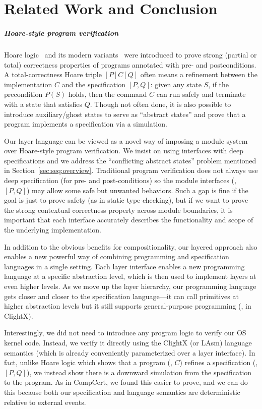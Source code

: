 
\chapter{Related Work and Conclusion}
\label{chap-rel}

\paragraph{Hoare-style program verification} Hoare logic~\cite{hoare69}
and its modern variants~\cite{reynolds02,boogie05,nanevski06} were
introduced to prove strong (partial or total) correctness properties
of programs annotated with pre- and postconditions. A
total-correctness Hoare triple $[P]C[Q]$ often means a refinement
between the implementation $C$ and the specification $[P,Q]$: given
any state $S$, if the precondition $P(S)$ holds, then the command $C$
can run safely and terminate with a state that satisfies $Q$. Though
not often done, it is also possible to introduce auxiliary/ghost
states to serve as ``abstract states'' and prove that a program
implements a specification via a simulation.
  
Our layer language can be viewed as a novel way of imposing a module
system over Hoare-style program verification. We insist on using
interfaces with deep specifications and we address the ``conflicting
abstract states'' problem mentioned in
Section~\ref{sec:seq:overview}. Traditional program verification does not
always use deep specification (for pre- and post-conditions) so the
module interfaces (\eg, $[P,Q]$) may allow some safe but unwanted
behaviors. Such a gap is fine if the goal is just to prove safety (as in
static type-checking), but if we want to prove the strong contextual
correctness property across module boundaries, it is important that
each interface accurately describes the functionality and scope of the
underlying implementation.

In addition to the obvious benefits for compositionality, our layered
approach also enables a new powerful way of combining programming and
specification languages in a single setting. Each layer interface
enables a new programming language at a specific abstraction level,
which is then used to implement layers at even higher
levels. As we move up the layer hierarchy, our programming language
gets closer and closer to the specification language---it can call
primitives at higher abstraction levels but it still supports
general-purpose programming (\eg, in ClightX).

Interestingly, we did not need to introduce any program logic to
verify our OS kernel code. Instead, we verify it directly using the
ClightX (or LAsm) language semantics (which is already conveniently
parameterized over a layer interface).  In fact, unlike Hoare logic
which shows that a program (\eg, $C$) refines a specification (\eg,
$[P,Q]$), we instead show there is a downward simulation from the
specification to the program. As in CompCert, we found this easier to
prove, and we can do this because both our specification and language
semantics are deterministic relative to external events.

